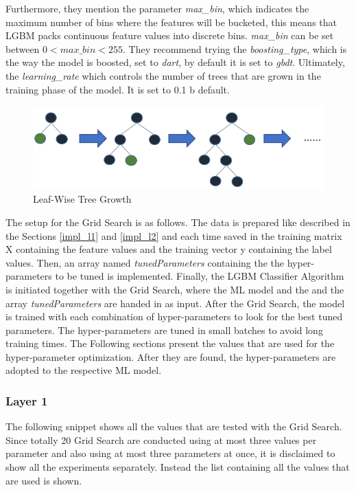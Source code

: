 Furthermore, they mention the parameter \textit{max\_bin}, which indicates the maximum number of bins where the features will be bucketed, this means that LGBM packs continuous feature values into discrete bins. \textit{max\_bin} can be set between $0 < max\_bin <255$. They recommend trying the \textit{boosting\_type}, which is the way the model is boosted, set to \textit{dart}, by default it is set to \textit{gbdt}. Ultimately, the \textit{learning\_rate} which controls the number of trees that are grown in the training phase of the model. It is set to 0.1 b default.

\begin{figure} [h]
\includegraphics[scale=0.6]{images/leaf-wise.png}
\centering
\caption{Leaf-Wise Tree Growth \cite{lightGBM}}
\label{fig:leaf_wise}
\end{figure}

The setup for the Grid Search is as follows. The data is prepared like described in the Sections \ref{impl_l1} and \ref{impl_l2} and each time saved in the training matrix X containing the feature values and the training vector y containing the label values. Then, an array named \textit{tunedParameters} containing the the hyper-parameters to be tuned is implemented. Finally, the LGBM Classifier Algorithm is initiated together with the Grid Search, where the ML model and the and the array \textit{tunedParameters} are handed in as input. After the Grid Search, the model is trained with each combination of hyper-parameters to look for the best tuned parameters. The hyper-parameters are tuned in small batches to avoid long training times. The Following sections present the values that are used for the hyper-parameter optimization. After they are found, the hyper-parameters are adopted to the respective ML model.

\subsubsection{Layer 1}
The following snippet shows all the values that are tested with the Grid Search. Since totally 20 Grid Search are conducted using at most three values per parameter and also using at most three parameters at once, it is disclaimed to show all the experiments separately. Instead the list containing all the values that are used is shown.

